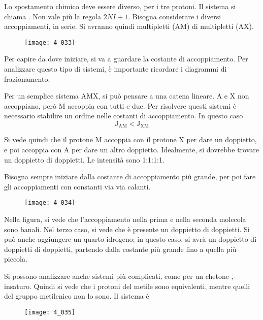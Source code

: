 Lo spostamento chimico deve essere diverso, per i tre protoni. Il sistema si chiama . Non vale più la regola \(2NI+1\). Bisogna considerare i diversi accoppiamenti, in serie. Si avranno quindi multipletti (AM) di multipletti (AX).

\begin{figure}[H]
  \texttt{[image: 4\_033]}
\end{figure}

Per capire da dove iniziare, si va a guardare la costante di accoppiamento. Per analizzare questo tipo di sistemi, è importante ricordare i diagrammi di frazionamento.

Per un semplice sistema AMX, si può pensare a una catena lineare. A e X non accoppiano, però M accoppia con tutti e due. Per risolvere questi sistemi è necessario stabilire un ordine nelle costanti di accoppiamento. In questo caso
\[
  \text{J}_{\text{AM}} < \text{J}_{\text{XM}}
\]

Si vede quindi che il protone M accoppia con il protone X per dare un doppietto, e poi accoppia con A per dare un altro doppietto. Idealmente, si dovrebbe trovare un doppietto di doppietti. Le intensità sono 1:1:1:1.

Bisogna sempre iniziare dalla costante di accoppiamento più grande, per poi fare gli accoppiamenti con constanti via via calanti.

\begin{figure}[H]
  \texttt{[image: 4\_034]}
\end{figure}


Nella figura, si vede che l'accoppiamento nella prima e nella seconda molecola sono banali.
Nel terzo caso, si vede che è presente un doppietto di doppietti. Si può anche aggiungere un quarto idrogeno; in questo caso, si avrà un doppietto di doppietti di doppietti, partendo dalla costante più grande fino a quella più piccola.


Si possono analizzare anche sistemi più complicati, come per un chetone \alpha,\beta-insaturo.
Quindi si vede che i protoni del metile sono equivalenti, mentre quelli del gruppo metilenico non lo sono. Il sistema è 

\begin{figure}[H]
  \texttt{[image: 4\_035]}
\end{figure}

